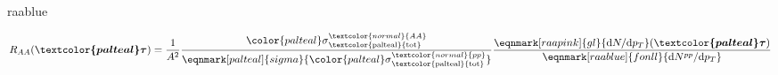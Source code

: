 \documentclass[aspectratio=169,11pt,usenames,dvipsnames]{beamer}
\begin{document}
\begin{frame}[noframenumbering]
{\begin{columns}[onlytextwidth,t]
\begin{center}
\begin{custombox2transp}{}{raablue}
\begin{varwidth}{1.05\textwidth}
\begin{itemize}
            \end{itemize}
            \end{varwidth}
        \end{custombox2transp}
        \vspace{-10pt}
        \renewcommand{\eqnhighlightheight}{\vphantom{\mathcal{D}_\mu}\mathstrut}
        \begin{equation*}
            \hspace{0pt}
            R_{AA}(\boldsymbol{\textcolor{palteal}\tau})=\dfrac{1}{A^2}\dfrac{{\color{palteal}\sigma}^{\textcolor{normal}{AA}}_{\mathrm{\textcolor{palteal}{tot}}}}{\eqnmark[palteal]{sigma}{{\color{palteal}\sigma}^{\textcolor{normal}{pp}}_{\mathrm{\textcolor{palteal}{tot}}}}}\dfrac{\eqnmark[raapink]{gl}{\mathrm{d}N/\mathrm{d}p_T}(\boldsymbol{\textcolor{palteal}\tau})}{\eqnmark[raablue]{fonll}{\mathrm{d}N^{pp}/\mathrm{d}p_T}}
        \end{equation*}


\end{center}
\end{columns}}
\end{frame}
\end{document}

